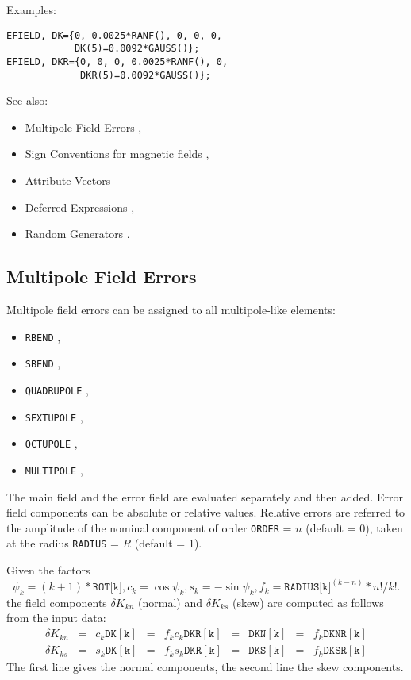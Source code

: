 Examples:
\begin{verbatim}
EFIELD, DK={0, 0.0025*RANF(), 0, 0, 0,
            DK(5)=0.0092*GAUSS()};
EFIELD, DKR={0, 0, 0, 0.0025*RANF(), 0,
             DKR(5)=0.0092*GAUSS()};
\end{verbatim}
See also:
\begin{itemize}
\item Multipole Field Errors ,
\item Sign Conventions for magnetic fields ,
\item Attribute Vectors 
\item Deferred Expressions ,
\item Random Generators .
\end{itemize}

\subsection{Multipole Field Errors}
\label{sec:errormulti}
Multipole field errors can be assigned to all multipole-like elements:
\begin{itemize}
\item \texttt{RBEND} ,
\item \texttt{SBEND} ,
\item \texttt{QUADRUPOLE} ,
\item \texttt{SEXTUPOLE} ,
\item \texttt{OCTUPOLE} ,
\item \texttt{MULTIPOLE} ,
\end{itemize}
The main field and the error field are evaluated separately and then added.
Error field components can be absolute or relative values.
Relative errors are referred to the amplitude of the nominal component
of order \texttt{ORDER} = $n$ (default = 0),
taken at the radius \texttt{RADIUS} = $R$ (default = 1).

Given the factors
\[
\psi_k = (k + 1) * \texttt{ROT[k]},
c_k = \cos \psi_k,
s_k = - \sin \psi_k,
f_k = \texttt{RADIUS[k]}^(k-n) * n! / k!.
\]
the field components
$\delta K_{kn}$ (normal) and $\delta K_{ks}$ (skew)
are computed as follows from the input data:
\[
\begin{array}{lclclclcl}
  \delta K_{kn} &=& c_k \mathtt{DK[k]} &=& f_k c_k \mathtt{DKR[k]} &=&
  \mathtt{DKN[k]} &=& f_k \mathtt{DKNR[k]} \\
  \delta K_{ks} &=& s_k \mathtt{DK[k]} &=& f_k s_k \mathtt{DKR[k]} &=&
  \mathtt{DKS[k]} &=& f_k \mathtt{DKSR[k]}
\end{array}
\]
The first line gives the normal components,
the second line the skew components.

